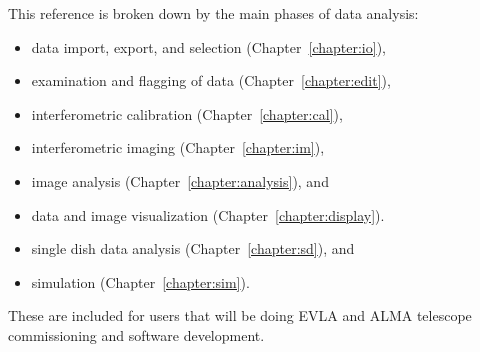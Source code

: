 This reference is broken down by the main phases of data analysis:
\begin{itemize}
   \item data import, export, and selection (Chapter~\ref{chapter:io}),

   \item examination and flagging of data (Chapter~\ref{chapter:edit}),

   \item interferometric calibration (Chapter~\ref{chapter:cal}),

   \item interferometric imaging (Chapter~\ref{chapter:im}),

   \item image analysis (Chapter~\ref{chapter:analysis}), and

   \item data and image visualization (Chapter~\ref{chapter:display}).

   \item single dish data analysis (Chapter~\ref{chapter:sd}), and

   \item simulation (Chapter~\ref{chapter:sim}).

\end{itemize}
These are included for users that will be doing EVLA and ALMA
telescope commissioning and software development.

